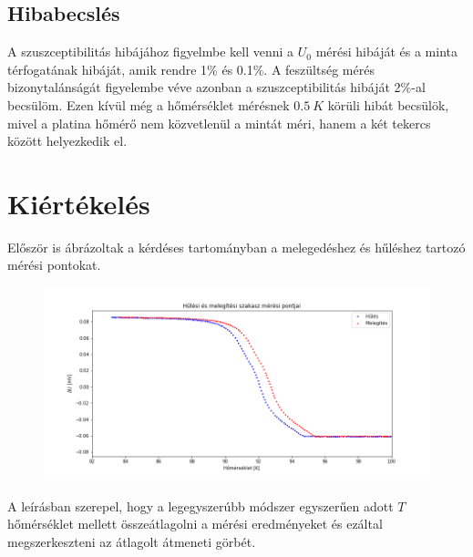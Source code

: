 \documentclass[a4paper,12pt]{article}
\begin{document}
\subsection{Hibabecslés}

\par A szuszceptibilitás hibájához figyelmbe kell venni a $U_{0}$ mérési hibáját és a minta térfogatának hibáját, amik rendre 1\% és 0.1\%. A feszültség mérés bizonytalánságát figyelembe véve azonban a szuszceptibilitás hibáját 2\%-al becsülöm. Ezen kívül még a hőmérséklet mérésnek $0.5~K$ körüli hibát becsülök, mivel a platina hőmérő nem közvetlenül a mintát méri, hanem a két tekercs között helyezkedik el.

\section{ Kiértékelés}

\vspace{2mm}

\par Először is ábrázoltak a kérdéses tartományban a melegedéshez és hűléshez tartozó mérési pontokat.

\vspace{2mm}

\begin{figure}[!htb]
\centering
\includegraphics[width=.95\textwidth]{coolingAndHeating.png}
\end{figure}

\vspace{2mm}

\par A leírásban szerepel, hogy a legegyszerúbb módszer egyszerűen adott $T$ hőmérséklet mellett összeátlagolni a mérési eredményeket és ezáltal megszerkeszteni az átlagolt átmeneti görbét.

\vspace{2mm}
\end{document}
